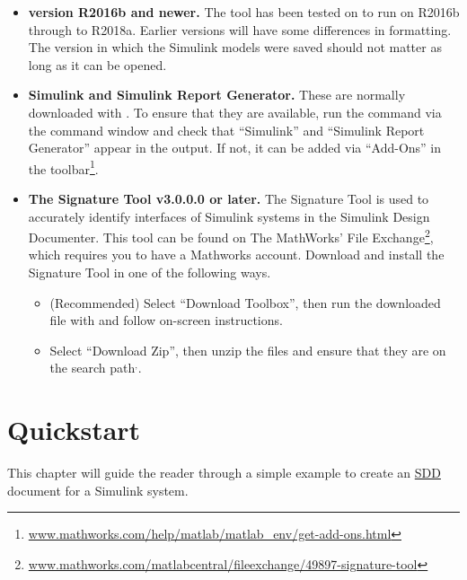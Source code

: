 \documentclass{mcscert}
\newcommand{\mathworks}{The MathWorks}
\newcommand{\simulink}{Simulink}
\newcommand{\rptgen}{\simulink{} Report Generator}
\newcommand{\sigtool}{Signature Tool}
\newcommand{\sddtool}{Simulink Design Documenter}
\begin{document}
\begin{itemize}
		\item {\bf \matlab version R2016b and newer.}  \label{ite:matlab-ver} 
		The tool has been tested on to run on \matlab{} R2016b through to R2018a. 
		Earlier versions will have some differences in formatting. 
		The version in which the \simulink{} models were saved should not matter as long as it can be opened. %
	
		\item {\bf{\simulink{} and \rptgen{}.}} 
		These are normally downloaded with \matlab{}. 
		To ensure that they are available, run the {\bf{}} command via the \matlab{} command window and check	that ``\simulink{}'' and ``\rptgen{}'' appear in the output. 
		If not, it can be added via ``Add-Ons'' in the toolbar\footnote{\href{https://www.mathworks.com/help/matlab/matlab_env/get-add-ons.html}{www.mathworks.com/help/matlab/matlab\_env/get-add-ons.html}}.
		
		\item {\bf{The \sigtool{} v3.0.0.0 or later.}}
		The \sigtool{} is used to accurately identify interfaces of \simulink{} systems in the \sddtool{}. 
		This tool can be found on \mathworks{}' File Exchange\footnote{\href{https://www.mathworks.com/matlabcentral/fileexchange/49897-signature-tool}{www.mathworks.com/matlabcentral/fileexchange/49897-signature-tool}}, which requires you to have a Mathworks account\label{itm:download-tool}. 
		Download and install the \sigtool{} in one of the following ways. %
		
		\begin{itemize}
			\item (Recommended) Select ``Download Toolbox'', then run the downloaded file with \matlab{} and follow on-screen instructions.
			\item Select ``Download Zip'', then unzip the files and ensure that they are on the \matlab{} search path$^{,}$.
		\end{itemize}
\end{itemize}

\chapter{Quickstart} 
\label{ch:quickstart}
This chapter will guide the reader through a simple example to create an \hyperref[acr:sdd]{SDD} document for a \simulink{} system.
\end{document}
